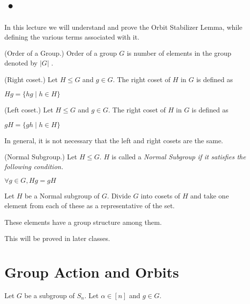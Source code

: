 

\section*{•}
In this lecture we will understand and prove the Orbit Stabilizer Lemma, while defining the various terms associated with it.


\begin{definition}(Order of a Group.) Order of a group $G$ is number of elements in the group denoted by $|G|$ .
\end{definition}

\begin{definition}(Right coset.) Let $H \le G$ and $g \in G$. The right coset of $H$ in $G$ is defined as 
\begin{center}
$Hg = \{hg \mid h \in H\}$
\end{center}
\end{definition}

\begin{definition}(Left coset.) Let $H \le G$ and $g \in G$. The right coset of $H$ in $G$ is defined as 
\begin{center}
$gH = \{gh \mid h \in H\}$
\end{center}
\end{definition}

\begin{note}
In general, it is not necessary that the left and right cosets are the same.
\end{note}

\begin{definition}(Normal Subgroup.)
Let $H \le G$. $H$ is called a \em Normal Subgroup if it satisfies the following condition.
\begin{center}
$\forall g \in G, Hg= gH$
\end{center}
\end{definition}

Let $H$ be a Normal subgroup of $G$. Divide $G$ into cosets of $H$ and take one element from each of these as a representative of the set.
\begin{claim} These elements have a group structure among them. \end{claim}
This will be proved in later classes.

\section{Group Action and Orbits}
Let $G$ be a subgroup of $S_n$. Let $\alpha \in [n]$ and $g \in G$.


